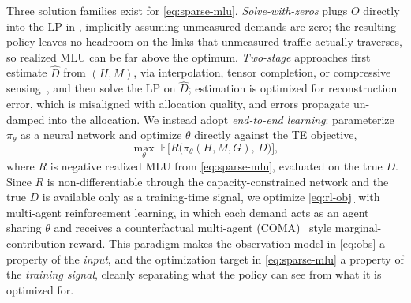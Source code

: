 Three solution families exist for \cref{eq:sparse-mlu}.
\emph{Solve-with-zeros} plugs $O$ directly into the
LP in , implicitly assuming unmeasured
demands are zero; the resulting policy leaves no headroom on the links
that unmeasured traffic actually traverses, so realized MLU can be far
above the optimum. \emph{Two-stage} approaches first estimate $\hat{D}$ from $(H, M)$,
via interpolation, tensor completion, or compressive
sensing~\cite{vardi1996,zhang2003,zhang2009}, and then
solve the LP on $\hat{D}$; estimation is optimized for reconstruction error,
which is misaligned with allocation quality, and errors propagate un-damped
into the allocation. We instead adopt \emph{end-to-end learning}:
parameterize $\pi_\theta$ as a neural network and optimize $\theta$ directly
against the TE objective,
\begin{equation}
    \max_{\theta} \;
    \mathbb{E} \bigl[ R\bigl(\pi_\theta(H, M, G),\, D\bigr) \bigr],
    \label{eq:rl-obj}
\end{equation}
where $R$ is negative realized MLU from \cref{eq:sparse-mlu}, evaluated
on the true $D$. Since $R$
is non-differentiable through the capacity-constrained network and the true
$D$ is available only as a training-time signal, we
optimize \cref{eq:rl-obj} with multi-agent reinforcement learning, in
which each demand acts as an agent sharing $\theta$ and receives a
counterfactual multi-agent (COMA)~\cite{foerster2018} style
marginal-contribution reward. This paradigm makes the observation
model in \cref{eq:obs} a property of the \emph{input}, and the optimization
target in \cref{eq:sparse-mlu} a property of the \emph{training signal},
cleanly separating what the policy can see from what it is optimized for.
